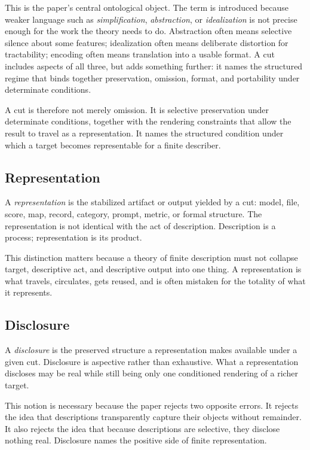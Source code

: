 \documentclass[11pt]{article}
\renewcommand{\emph}[1]{\textit{#1}}
\begin{document}
This is the paper's central ontological object. The term is introduced because weaker language such as \emph{simplification}, \emph{abstraction}, or \emph{idealization} is not precise enough for the work the theory needs to do. Abstraction often means selective silence about some features; idealization often means deliberate distortion for tractability; encoding often means translation into a usable format. A cut includes aspects of all three, but adds something further: it names the structured regime that binds together preservation, omission, format, and portability under determinate conditions. \cite{frigg_hartmann_models_sep,frigg_nguyen_scientific_representation_sep}

A cut is therefore not merely omission. It is selective preservation under determinate conditions, together with the rendering constraints that allow the result to travel as a representation. It names the structured condition under which a target becomes representable for a finite describer.

\subsection{Representation}

A \emph{representation} is the stabilized artifact or output yielded by a cut: model, file, score, map, record, category, prompt, metric, or formal structure. The representation is not identical with the act of description. Description is a process; representation is its product.

This distinction matters because a theory of finite description must not collapse target, descriptive act, and descriptive output into one thing. A representation is what travels, circulates, gets reused, and is often mistaken for the totality of what it represents.

\subsection{Disclosure}

A \emph{disclosure} is the preserved structure a representation makes available under a given cut. Disclosure is aspective rather than exhaustive. What a representation discloses may be real while still being only one conditioned rendering of a richer target. \cite{frigg_nguyen_scientific_representation_sep,chakravartty_scientific_realism_sep,ladyman_structural_realism_sep}

This notion is necessary because the paper rejects two opposite errors. It rejects the idea that descriptions transparently capture their objects without remainder. It also rejects the idea that because descriptions are selective, they disclose nothing real. Disclosure names the positive side of finite representation.
\end{document}
